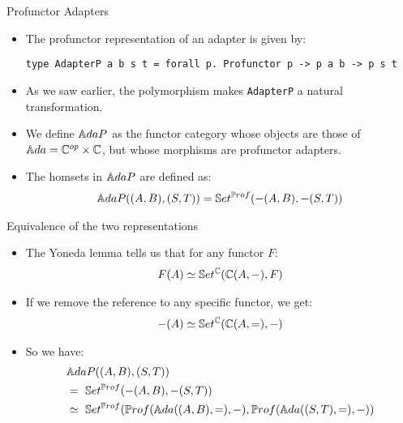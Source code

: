 \begin{frame}[fragile]{Profunctor Adapters}
	\begin{itemize}
		\item The profunctor representation of an adapter is given by:
		\begin{lstlisting}
type AdapterP a b s t = forall p. Profunctor p -> p a b -> p s t
		\end{lstlisting}
		\pause\item As we saw earlier, the polymorphism makes \texttt{AdapterP} a natural transformation.
		\pause\item We define $\mathbb{A}daP$ as the functor category whose objects are those of ${\mathbb{A}da} = \mathbb{C}^{op} \times \mathbb{C}$, but whose morphisms are profunctor adapters.
		\pause\item The homsets in $\mathbb{A}daP$ are defined as:
		\begin{align*}
			\mathbb{A}daP ((A,B),(S,T)) &= \mathbb{S}et^{\mathbb{P}rof}(-(A, B), -(S, T))\\
		\end{align*}
		\end{itemize}
\end{frame}
\begin{frame}[fragile]{Equivalence of the two representations}
	\begin{itemize}
		\item The Yoneda lemma tells us that for any functor $F$:
		\begin{align*}
			F(A) \simeq \mathbb{S}et^{\mathbb{C}}(\mathbb{C}(A, -), F)
		\end{align*}
		\pause\item If we remove the reference to any specific functor, we get:
		\begin{align*}
			-(A) \simeq \mathbb{S}et^{\mathbb{C}}(\mathbb{C}(A, =), -)
		\end{align*}
		\vspace{-18pt}\pause\item So we have:
		\begin{align*}
			&\mathbb{A}daP ((A,B),(S,T))\\
			&=\ \mathbb{S}et^{{\mathbb{P}rof}}(-(A, B), -(S, T))\\ 
			&\simeq\ \mathbb{S}et^{{\mathbb{P}rof}}({\mathbb{P}rof}({\mathbb{A}da}((A, B), =), -), {\mathbb{P}rof}({\mathbb{A}da}((S, T), =), -))\\
		\end{align*}
	\end{itemize}
\end{frame}
